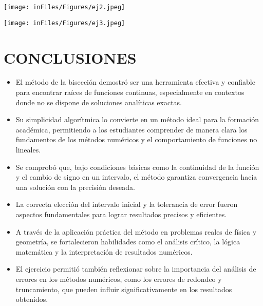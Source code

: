 \documentclass[12pt]{article}
\begin{document}
\vspace{0.5cm}

\begin{minipage}{0.95\textwidth}
    \raggedleft
    \texttt{[image: inFiles/Figures/ej2.jpeg]}
\end{minipage}

\vspace{0.5cm}

\begin{minipage}{0.95\textwidth}
    \raggedleft
    \texttt{[image: inFiles/Figures/ej3.jpeg]}
\end{minipage}

\vspace{3cm}


\section*{CONCLUSIONES}
\begin{itemize}
    \item El método de la bisección demostró ser una herramienta efectiva y confiable para encontrar raíces de funciones continuas, especialmente en contextos donde no se dispone de soluciones analíticas exactas.

    \item Su simplicidad algorítmica lo convierte en un método ideal para la formación académica, permitiendo a los estudiantes comprender de manera clara los fundamentos de los métodos numéricos y el comportamiento de funciones no lineales.

    \item Se comprobó que, bajo condiciones básicas como la continuidad de la función y el cambio de signo en un intervalo, el método garantiza convergencia hacia una solución con la precisión deseada.

    \item La correcta elección del intervalo inicial y la tolerancia de error fueron aspectos fundamentales para lograr resultados precisos y eficientes.

    \item A través de la aplicación práctica del método en problemas reales de física y geometría, se fortalecieron habilidades como el análisis crítico, la lógica matemática y la interpretación de resultados numéricos.

    \item El ejercicio permitió también reflexionar sobre la importancia del análisis de errores en los métodos numéricos, como los errores de redondeo y truncamiento, que pueden influir significativamente en los resultados obtenidos.
\end{itemize}
\end{document}
